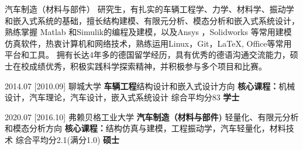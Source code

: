 \documentclass[zh]{resume}
\begin{document}
\makeheader


	{\onehalfspacing\hspace{2em}%
汽车制造（材料与部件） 研究生，有扎实的车辆工程学、力学、材料学、振动学和嵌入式系统的基础，擅长结构建模、有限元分析、模态分析和嵌入式系统设计，熟练掌握 Matlab 和Simulik的编程及建模，以及Ansys ，Solidworks 等常用建模仿真软件，热衷计算机和网络技术，熟练运用Linux，Git，\LaTeX , Office等常用平台和工具。
拥有长达4年多的德国留学经历，具有优秀的德语沟通交流能力，硕士在校成绩优秀，积极实践科学探索精神，并积极参与多个项目和比赛。
\par}



	\begin{educations}
		
		
		\education%
		{2014.07}%
		[2010.09]%
		{聊城大学}%
		{\textbf{车辆工程}\textbullet 结构设计和嵌入式设计方向 }%
		{\textbf{核心课程：}机械设计，汽车理论，汽车设计，嵌入式系统设计 \textbullet 综合平均分83}%
		{\textbf{学士}}
		
		\separator{0.5ex}
		
		\education%
		{2020.07}%
		[2016.10]%
		{弗赖贝格工业大学}%
		{\textbf{汽车制造（材料与部件)} \textbullet  轻量化、有限元分析和模态分析方向}%
		{\textbf{核心课程：}结构仿真与建模，工程振动学，汽车轻量化，材料技术 \textbullet 综合平均分2.1(满分1.0)}%
		{\textbf{硕士}}
		
			
	\end{educations}
\end{document}
